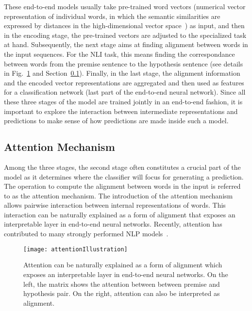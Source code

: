These end-to-end models usually take pre-trained word vectors (numerical vector representation of individual words, in which the semantic similarities are expressed by distances in the high-dimensional vector space~\cite{MikolovSutskeverChen2013, PenningtonSocherManning2014}) as input, and then in the encoding stage, the pre-trained vectors are adjusted to the specialized task at hand. Subsequently, the next stage aims at finding alignment between words in the input sequences. For the NLI task, this means finding the correspondance between words from the premise sentence to the hypothesis sentence (see details in Fig.~\ref{fig:attention} and Section~\ref{sec:attention}). Finally, in the last stage, the alignment information and the encoded vector representations are aggregated and then used as features for a classification network (last part of the end-to-end neural network).
%
Since all these three stages of the model are trained jointly in an end-to-end fashion, it is important to explore the interaction between intermediate representations and predictions to make sense of how predictions are made inside such a model.

\subsection{Attention Mechanism}
\label{sec:attention}
Among the three stages, the second stage often constitutes a crucial part of the model as it determines where the classifier will focus for generating a prediction. The operation to compute the alignment between words in the input is referred to as the attention mechanism. 
The introduction of the attention mechanism~\cite{bahdanau2014neural} allows
pairwise interaction between internal representations of words. 
This interaction can be naturally explained as a form of alignment that exposes an interpretable layer in end-to-end neural networks.
%
Recently, attention has contributed to many strongly performed NLP models~\cite{parikh2016emnlp,rush2015neural,yang2016hierarchical,seo2016bidirectional,schwartz2017high}.

\begin{figure}[htbp]
\centering
\vspace{-2mm}
 \texttt{[image: attentionIllustration]}
  \vspace{-2mm}
 \caption{Attention can be naturally explained as a form of alignment which exposes an interpretable layer in end-to-end neural networks. On the left, the matrix shows the attention between between premise and hypothesis pair. On the right, attention can also be interpreted as alignment.}
\label{fig:attention}
  \vspace{-2mm}
\end{figure}

